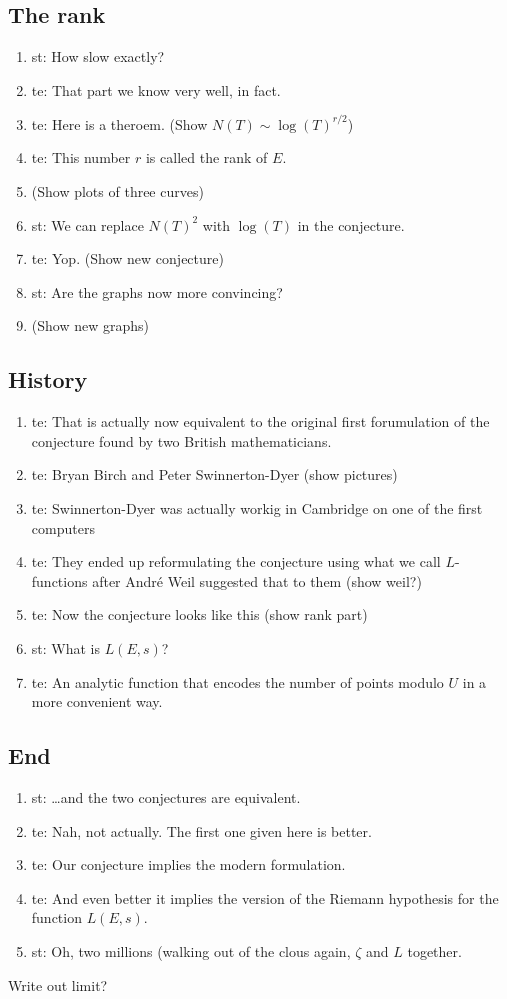 \documentclass[a4paper]{article}
\begin{document}
\subsection{The rank}
\begin{enumerate}
  \item st: How slow exactly?
  \item te: That part we know very well, in fact.
  \item te: Here is a theroem. (Show $N(T) \sim \log(T)^{r/2}$)
  \item te: This number $r$ is called the rank of $E$.
  \item (Show plots of three curves)
  \item st: We can replace $N(T)^2$ with $\log(T)$ in the conjecture.
  \item te: Yop. (Show new conjecture)
  \item st: Are the graphs now more convincing?
  \item (Show new graphs)
\end{enumerate}

\subsection{History}
\begin{enumerate}
  \item te: That is actually now equivalent to the original first forumulation of the conjecture found by two British mathematicians.
  \item te: Bryan Birch and Peter Swinnerton-Dyer (show pictures)
  \item te: Swinnerton-Dyer was actually workig in Cambridge on one of the first computers
  \item te: They ended up reformulating the conjecture using what we call $L$-functions after André Weil suggested that to them (show weil?)
  \item te: Now the conjecture looks like this (show rank part)
  \item st: What is $L(E,s)$?
  \item te: An analytic function that encodes the number of points modulo $U$ in a more convenient way.
\end{enumerate}

\subsection{End}
\begin{enumerate}
  \item st: \dots and the two conjectures are equivalent.
  \item te: Nah, not actually. The first one given here is better.
  \item te: Our conjecture implies the modern formulation.
  \item te: And even better it implies the version of the Riemann hypothesis for the function $L(E,s)$.
  \item st: Oh, two millions (walking out of the clous again, $\zeta$ and $L$ together.
\end{enumerate}

Write out limit?
\end{document}
